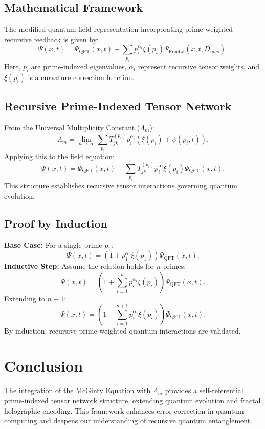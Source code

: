\documentclass{article}
\theoremstyle{plain}
\begin{document}
\subsection{Mathematical Framework}
The modified quantum field representation incorporating prime-weighted recursive feedback is given by:
\begin{equation}
    \Psi(x,t) = \Psi_{\text{QFT}}(x,t) + \sum_{p_i} p_i^{\alpha_i} \xi(p_i) \Psi_{\text{Fractal}}(x,t,D_{mqs}).
\end{equation}
Here, $p_i$ are prime-indexed eigenvalues, $\alpha_i$ represent recursive tensor weights, and $\xi(p_i)$ is a curvature correction function.

\subsection{Recursive Prime-Indexed Tensor Network}
From the Universal Multiplicity Constant ($\Lambda_m$):
\begin{equation}
    \Lambda_m = \lim_{n\to\infty} \sum_{p_i} T_{jk}^{(p_i)} p_i^{\alpha_i} (\xi(p_i) + \psi(p_i, t)).
\end{equation}
Applying this to the field equation:
\begin{equation}
    \Psi(x,t) = \Psi_{\text{QFT}}(x,t) + \sum_{p_i} T_{jk}^{(p_i)} p_i^{\alpha_i} \xi(p_i) \Psi_{\text{QFT}}(x,t).
\end{equation}
This structure establishes recursive tensor interactions governing quantum evolution.

\subsection{Proof by Induction}
\textbf{Base Case:} For a single prime $p_1$:
\begin{equation}
    \Psi(x,t) = \left( 1 + p_1^{\alpha_1} \xi(p_1) \right) \Psi_{\text{QFT}}(x,t).
\end{equation}
\textbf{Inductive Step:} Assume the relation holds for $n$ primes:
\begin{equation}
    \Psi(x,t) = \left( 1 + \sum_{i=1}^{n} p_i^{\alpha_i} \xi(p_i) \right) \Psi_{\text{QFT}}(x,t).
\end{equation}
Extending to $n+1$:
\begin{equation}
    \Psi(x,t) = \left( 1 + \sum_{i=1}^{n+1} p_i^{\alpha_i} \xi(p_i) \right) \Psi_{\text{QFT}}(x,t).
\end{equation}
By induction, recursive prime-weighted quantum interactions are validated.

\section{Conclusion}
The integration of the McGinty Equation with $\Lambda_m$ provides a self-referential prime-indexed tensor network structure, extending quantum evolution and fractal holographic encoding. This framework enhances error correction in quantum computing and deepens our understanding of recursive quantum entanglement.

\nocite{*}


\end{document}
